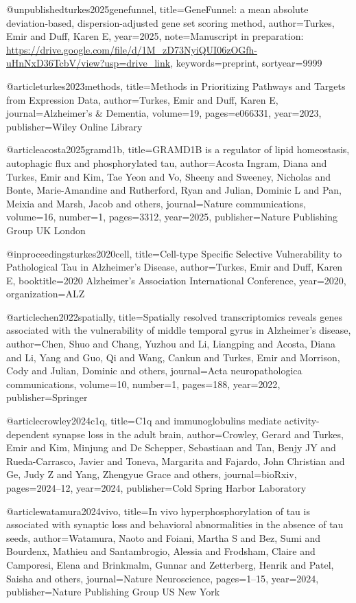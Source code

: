 @unpublished{turkes2025genefunnel,
  title={GeneFunnel: a mean absolute deviation-based, dispersion-adjusted gene set scoring method},
  author={Turkes, Emir and Duff, Karen E},
  year={2025},
  note={Manuscript in preparation: \url{https://drive.google.com/file/d/1M_zD73NyiQUI06zOGfh-uHnNxD36TcbV/view?usp=drive_link}},
  keywords={preprint},
  sortyear={9999}
}

@article{turkes2023methods,
  title={Methods in Prioritizing Pathways and Targets from Expression Data},
  author={Turkes, Emir and Duff, Karen E},
  journal={Alzheimer's \& Dementia},
  volume={19},
  pages={e066331},
  year={2023},
  publisher={Wiley Online Library}
}

@article{acosta2025gramd1b,
  title={GRAMD1B is a regulator of lipid homeostasis, autophagic flux and phosphorylated tau},
  author={Acosta Ingram, Diana and Turkes, Emir and Kim, Tae Yeon and Vo, Sheeny and Sweeney, Nicholas and Bonte, Marie-Amandine and Rutherford, Ryan and Julian, Dominic L and Pan, Meixia and Marsh, Jacob and others},
  journal={Nature communications},
  volume={16},
  number={1},
  pages={3312},
  year={2025},
  publisher={Nature Publishing Group UK London}
}

@inproceedings{turkes2020cell,
  title={Cell-type Specific Selective Vulnerability to Pathological Tau in Alzheimer's Disease},
  author={Turkes, Emir and Duff, Karen E},
  booktitle={2020 Alzheimer's Association International Conference},
  year={2020},
  organization={ALZ}
}

@article{chen2022spatially,
  title={Spatially resolved transcriptomics reveals genes associated with the vulnerability of middle temporal gyrus in Alzheimer’s disease},
  author={Chen, Shuo and Chang, Yuzhou and Li, Liangping and Acosta, Diana and Li, Yang and Guo, Qi and Wang, Cankun and Turkes, Emir and Morrison, Cody and Julian, Dominic and others},
  journal={Acta neuropathologica communications},
  volume={10},
  number={1},
  pages={188},
  year={2022},
  publisher={Springer}
}

@article{crowley2024c1q,
  title={C1q and immunoglobulins mediate activity-dependent synapse loss in the adult brain},
  author={Crowley, Gerard and Turkes, Emir and Kim, Minjung and De Schepper, Sebastiaan and Tan, Benjy JY and Rueda-Carrasco, Javier and Toneva, Margarita and Fajardo, John Christian and Ge, Judy Z and Yang, Zhengyue Grace and others},
  journal={bioRxiv},
  pages={2024--12},
  year={2024},
  publisher={Cold Spring Harbor Laboratory}
}

@article{watamura2024vivo,
  title={In vivo hyperphosphorylation of tau is associated with synaptic loss and behavioral abnormalities in the absence of tau seeds},
  author={Watamura, Naoto and Foiani, Martha S and Bez, Sumi and Bourdenx, Mathieu and Santambrogio, Alessia and Frodsham, Claire and Camporesi, Elena and Brinkmalm, Gunnar and Zetterberg, Henrik and Patel, Saisha and others},
  journal={Nature Neuroscience},
  pages={1--15},
  year={2024},
  publisher={Nature Publishing Group US New York}
}

